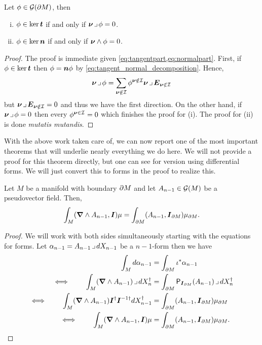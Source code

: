 \documentclass{article}
\begin{document}
\begin{proposition}
\label{prop:tangent_normal_proposition}
Let $\phi \in \mathcal{G}({\partial M})$, then 
\begin{enumerate}[i.]
\item $\phi \in \ker \boldsymbol{t}$ if and only if $\boldsymbol{\nu} \hspace*{.5mm}\lrcorner \hspace*{.5mm} \phi = 0$.
\item $\phi \in \ker \boldsymbol{n}$ if and only if $\boldsymbol{\nu} \wedge \phi = 0$.
\end{enumerate}
\end{proposition}
\begin{proof}
The proof is immediate given \cref{eq:tangentpart,eq:normalpart}. First, if $\phi \in \ker \boldsymbol{t}$ then $\phi = \boldsymbol{n} \phi$ by \cref{eq:tangent_normal_decomposition}. Hence,
\begin{equation}
\boldsymbol{\nu} \hspace*{.5mm}\lrcorner \hspace*{.5mm} \phi = \sum_{{\boldsymbol{\nu} \notin \mathcal{I}} } \phi^{{\boldsymbol{\nu} \notin \mathcal{I}}} \boldsymbol{\nu} \hspace*{.5mm}\lrcorner \hspace*{.5mm} \boldsymbol{E}_{\boldsymbol{\nu} \notin \mathcal{I}}
\end{equation}
but $\boldsymbol{\nu} \hspace*{.5mm}\lrcorner \hspace*{.5mm} \boldsymbol{E}_{\boldsymbol{\nu} \notin \mathcal{I}} = 0$ and thus we have the first direction. On the other hand, if $\boldsymbol{\nu} \hspace*{.5mm}\lrcorner \hspace*{.5mm} \phi = 0$ then every $\phi^{\boldsymbol{\nu} \in \mathcal{I}}=0$ which finishes the proof for (i). The proof for (ii) is done \emph{mutatis mutandis}.
\end{proof}

With the above work taken care of, we can now report one of the most important theorems that will underlie nearly everything we do here. We will not provide a proof for this theorem directly, but one can see \cite{schwarz_hodge_1995} for version using differential forms. We will just convert this to forms in the proof to realize this. 

\begin{theorem}
Let $M$ be a manifold with boundary ${\partial M}$ and let $A_{n-1} \in \mathcal{G}(M)$ be a pseudovector field. Then,
\begin{equation}
    \label{eq:stokes_theorem}
    \int_M (\boldsymbol{\nabla} \wedge A_{n-1}, \boldsymbol{I}) \mu = \int_{\partial M} (A_{n-1},\boldsymbol{I}_{\partial M})\mu_{\partial M}.
\end{equation}
\end{theorem}
\begin{proof}
We will work with both sides simultaneously starting with the equations for forms. Let $\alpha_{n-1}=A_{n-1}\hspace*{.5mm}\lrcorner \hspace*{.5mm} dX_{n-1}$ be a $n-1$-form then we have
\begin{align}
    \int_M d\alpha_{n-1} &= \int_{\partial M} \iota^* \alpha_{n-1}\\
 \iff \qquad   \int_M (\boldsymbol{\nabla} \wedge A_{n-1})\hspace*{.5mm}\lrcorner \hspace*{.5mm} dX_n^\dagger &= \int_{\partial M} \mathsf{P}_{\boldsymbol{I}_{\partial M}}(A_{n-1})\hspace*{.5mm}\lrcorner \hspace*{.5mm} dX_{n}^\dagger\\
 \iff \qquad  \int_M (\boldsymbol{\nabla} \wedge A_{n-1})\boldsymbol{I}^{\dagger} \boldsymbol{I}^{{-1} \dagger} dX_{n-1}^\dagger &= \int_{\partial M} (A_{n-1},\boldsymbol{I}_{\partial M})\mu_{\partial M}\\
 \iff \qquad \int_M (\boldsymbol{\nabla} \wedge A_{n-1},\boldsymbol{I}) \mu &= \int_{\partial M} (A_{n-1},\boldsymbol{I}_{\partial M})\mu_{\partial M}.
\end{align}
\end{proof}
\end{document}
